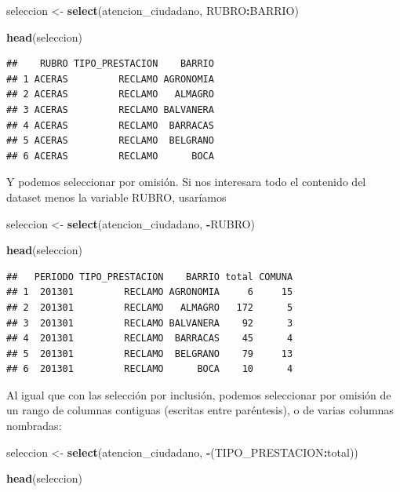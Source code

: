 \documentclass[spanish,]{book}
\newenvironment{Shaded}{\begin{snugshade}}{\end{snugshade}}
\newcommand{\KeywordTok}[1]{\textcolor[rgb]{0.13,0.29,0.53}{\textbf{#1}}}
\newcommand{\NormalTok}[1]{#1}
\newcommand{\OperatorTok}[1]{\textcolor[rgb]{0.81,0.36,0.00}{\textbf{#1}}}
\newcommand{\StringTok}[1]{\textcolor[rgb]{0.31,0.60,0.02}{#1}}
\begin{document}
\begin{Shaded}
\begin{Highlighting}[]
\NormalTok{seleccion <-}\StringTok{ }\KeywordTok{select}\NormalTok{(atencion_ciudadano, RUBRO}\OperatorTok{:}\NormalTok{BARRIO)}

\KeywordTok{head}\NormalTok{(seleccion)}
\end{Highlighting}
\end{Shaded}

\begin{verbatim}
##    RUBRO TIPO_PRESTACION    BARRIO
## 1 ACERAS         RECLAMO AGRONOMIA
## 2 ACERAS         RECLAMO   ALMAGRO
## 3 ACERAS         RECLAMO BALVANERA
## 4 ACERAS         RECLAMO  BARRACAS
## 5 ACERAS         RECLAMO  BELGRANO
## 6 ACERAS         RECLAMO      BOCA
\end{verbatim}

Y podemos seleccionar por omisión. Si nos interesara todo el contenido del dataset menos la variable RUBRO, usaríamos

\begin{Shaded}
\begin{Highlighting}[]
\NormalTok{seleccion <-}\StringTok{ }\KeywordTok{select}\NormalTok{(atencion_ciudadano, }\OperatorTok{-}\NormalTok{RUBRO)}

\KeywordTok{head}\NormalTok{(seleccion)}
\end{Highlighting}
\end{Shaded}

\begin{verbatim}
##   PERIODO TIPO_PRESTACION    BARRIO total COMUNA
## 1  201301         RECLAMO AGRONOMIA     6     15
## 2  201301         RECLAMO   ALMAGRO   172      5
## 3  201301         RECLAMO BALVANERA    92      3
## 4  201301         RECLAMO  BARRACAS    45      4
## 5  201301         RECLAMO  BELGRANO    79     13
## 6  201301         RECLAMO      BOCA    10      4
\end{verbatim}

Al igual que con las selección por inclusión, podemos seleccionar por omisión de un rango de columnas contiguas (escritas entre paréntesis), o de varias columnas nombradas:

\begin{Shaded}
\begin{Highlighting}[]
\NormalTok{seleccion <-}\StringTok{ }\KeywordTok{select}\NormalTok{(atencion_ciudadano, }\OperatorTok{-}\NormalTok{(TIPO_PRESTACION}\OperatorTok{:}\NormalTok{total))}

\KeywordTok{head}\NormalTok{(seleccion)}
\end{Highlighting}
\end{Shaded}
\end{document}
